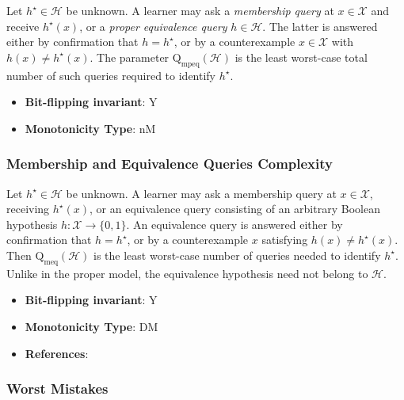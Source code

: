       \begin{definition}\label{def:membership_and_proper_equivalence_queries_complexity}
      Let $h^\star\in\mathcal H$ be unknown.  A learner may ask a \emph{membership query} at $x\in\mathcal X$ and receive $h^\star(x)$, or a \emph{proper equivalence query} $h\in\mathcal H$.  The latter is answered either by confirmation that $h=h^\star$, or by a counterexample $x\in\mathcal X$ with $h(x)\ne h^\star(x)$.  The parameter $\mathrm Q_{\mathrm{mpeq}}(\mathcal H)$ is the least worst-case total number of such queries required to identify $h^\star$.
      \end{definition}
      \begin{itemize}
      \item {\bf Bit-flipping invariant}: Y
      \item {\bf Monotonicity Type}: nM
      \end{itemize}
\subsubsection{Membership and Equivalence Queries Complexity}
      
      \begin{definition}\label{def:membership_and_equivalence_queries_complexity}
      Let $h^\star\in\mathcal H$ be unknown.  A learner may ask a membership query at $x\in\mathcal X$, receiving $h^\star(x)$, or an equivalence query consisting of an arbitrary Boolean hypothesis $h:\mathcal X\to\{0,1\}$.  An equivalence query is answered either by confirmation that $h=h^\star$, or by a counterexample $x$ satisfying $h(x)\ne h^\star(x)$.  Then $\mathrm Q_{\mathrm{meq}}(\mathcal H)$ is the least worst-case number of queries needed to identify $h^\star$.  Unlike in the proper model, the equivalence hypothesis need not belong to $\mathcal H$.
      \end{definition}
      \begin{itemize}
      \item {\bf Bit-flipping invariant}: Y
      \item {\bf Monotonicity Type}: DM
      \item {\bf References}: \cite{maass1992lower}
\end{itemize}
\subsubsection{Worst Mistakes}
      
